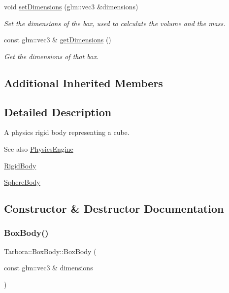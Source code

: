 \begin{DoxyCompactItemize}
void \hyperlink{classTarbora_1_1BoxBody_a5069f1364d8c8dcc33df56ad1fb477ac}{set\+Dimensions} (glm\+::vec3 \&dimensions)
\begin{DoxyCompactList}\small\item\em Set the dimensions of the box, used to calculate the volume and the mass. \end{DoxyCompactList}\item 
\mbox{\label{classTarbora_1_1BoxBody_a3f9e828d4fd6471896a068664b2d3e61}} 
const glm\+::vec3 \& \hyperlink{classTarbora_1_1BoxBody_a3f9e828d4fd6471896a068664b2d3e61}{get\+Dimensions} ()
\begin{DoxyCompactList}\small\item\em Get the dimensions of that box. \end{DoxyCompactList}\end{DoxyCompactItemize}
\subsection*{Additional Inherited Members}


\subsection{Detailed Description}
A physics rigid body representing a cube. 

\begin{DoxySeeAlso}{See also}
\hyperlink{classTarbora_1_1PhysicsEngine}{Physics\+Engine} 

\hyperlink{classTarbora_1_1RigidBody}{Rigid\+Body} 

\hyperlink{classTarbora_1_1SphereBody}{Sphere\+Body} 
\end{DoxySeeAlso}


\subsection{Constructor \& Destructor Documentation}
\mbox{\label{classTarbora_1_1BoxBody_a3b94290f40a1d3285712c19a33613e0e}} 
\subsubsection{\texorpdfstring{Box\+Body()}{BoxBody()}}
{\footnotesize\ttfamily Tarbora\+::\+Box\+Body\+::\+Box\+Body (\begin{DoxyParamCaption}\item[{const glm\+::vec3 \&}]{dimensions }\end{DoxyParamCaption})}



